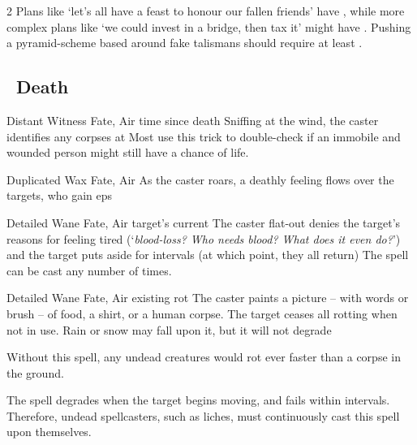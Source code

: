 \begin{multicols}{2}
{  Plans like `let's all have a feast to honour our fallen friends' have \tn[7], while more complex plans like `we could invest in a bridge, then tax it' might have \tn[10].
  Pushing a pyramid-scheme based around fake \glspl{talisman} should require at least \tn[13].}


\subsection[Death]{~Death}
\label{deathSpells}
\label{Death1}

\setcounter{diceNo}{1}


  {Distant}%
  {Witness}%
  {Fate, Air}%
  {time since death}%
  {Sniffing at the wind, the caster identifies any corpses at \spellRange}%
  {Most use this trick to double-check if an immobile and wounded person might still have a chance of life.}

  {Duplicated}%
  {Wax}%
  {Fate, Air}%
  {}%
  {As the caster roars, a deathly feeling flows over the targets, who gain  \glspl{ep}}%
  {}

  {Detailed}%
  {Wane}%
  {Fate, Air}%
  {target's current }%
  {The caster flat-out denies the target's reasons for feeling tired (`\textit{blood-loss? Who needs blood?  What does it even do?}') and the target puts aside   for  \glspl{interval} (at which point, they all return)}%
  {
  	The \gls{spell} can be cast any number of times.
  }

  {Detailed}%
  {Wane}%
  {Fate, Air}%
  {existing rot}%
  {The caster paints a picture -- with words or brush -- of food, a shirt, or a human corpse.
  The target ceases all rotting when not in use.
  Rain or snow may fall upon it, but it will not degrade}%
  {
    Without this spell, any undead creatures would rot ever faster than a corpse in the ground.

    The spell degrades when the target begins moving, and fails within  \glspl{interval}.
    Therefore, undead spellcasters, such as liches, must continuously cast this spell upon themselves.

}
\end{multicols}
